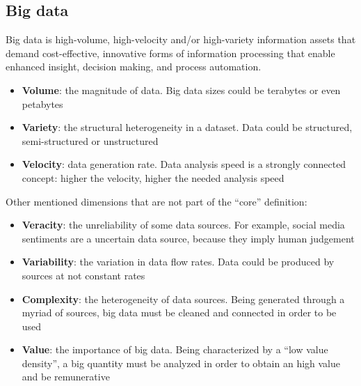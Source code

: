 \documentclass[\main/main.tex]{subfiles}
\begin{document}
\subsection{Big data}
Big data is high-volume, high-velocity and/or high-variety information assets that demand cost-effective, innovative forms of information processing that enable enhanced insight, decision making, and process automation\cite{bigdatagartner}.
\begin{itemize}
    \item \textbf{Volume}: the magnitude of data. Big data sizes could be terabytes or even petabytes
    \item \textbf{Variety}: the structural heterogeneity in a dataset. Data could be structured, semi-structured or unstructured
    \item \textbf{Velocity}: data generation rate. Data analysis speed is a strongly connected concept: higher the velocity, higher the needed analysis speed
\end{itemize}
Other mentioned dimensions that are not part of the ``core'' definition:
\begin{itemize}
    \item \textbf{Veracity}: the unreliability of some data sources. For example, social media sentiments are a uncertain data source, because they imply human judgement
    \item \textbf{Variability}: the variation in data flow rates. Data could be produced by sources at not constant rates
    \item \textbf{Complexity}: the heterogeneity of data sources. Being generated through a myriad of sources, big data must be cleaned and connected in order to be used
    \item \textbf{Value}: the importance of big data. Being characterized by a ``low value density'', a big quantity must be analyzed in order to obtain an high value and be remunerative
\end{itemize}\cite{Gandomi2015BeyondTH}
\end{document}
